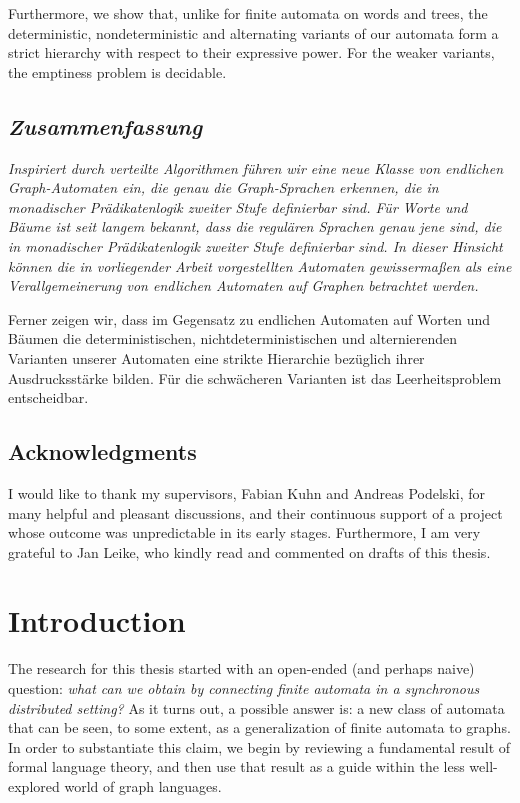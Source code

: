\documentclass[a4paper,11pt,twoside]{report} \pdfoutput=1
\begin{document}
Furthermore, we show that, unlike for finite automata on words and
trees, the deterministic, nondeterministic and alternating variants of
our automata form a strict hierarchy with respect to their expressive
power. For the weaker variants, the emptiness problem is decidable.

\vspace{.5cm}
\section*{\it{}\selectfont Zusammenfassung}
{\it
  Inspiriert durch verteilte Algorithmen führen wir eine neue Klasse
  von endlichen Graph-Automaten ein, die genau die Graph-Sprachen
  erkennen, die in mo\-na\-di\-scher Prädikatenlogik zweiter Stufe
  definierbar sind. Für Worte und Bäume ist seit langem bekannt, dass
  die regulären Sprachen genau jene sind, die in mo\-na\-di\-scher
  Prädikatenlogik zweiter Stufe definierbar sind. In dieser Hinsicht
  können die in vorliegender Arbeit vorgestellten Automaten gewissermaßen 
  als eine Verallgemeinerung von endlichen Automaten auf Graphen
  betrachtet werden.

  Ferner zeigen wir, dass im Gegensatz zu endlichen Automaten auf
  Worten und Bäumen die de\-ter\-mi\-nis\-tisch\-en,
  nichtdeterministischen und alternierenden Varianten unserer
  Automaten eine strikte Hierarchie bezüglich ihrer Ausdrucksstärke
  bilden. Für die schwächeren Varianten ist das Leerheitsproblem
  entscheidbar.  }

\clearpage
\thispagestyle{empty}
\section*{Acknowledgments}
I would like to thank my supervisors, Fabian Kuhn and Andreas
Podelski, for many helpful and pleasant discussions, and their
continuous support of a project whose outcome was unpredictable in its
early stages. Furthermore, I am very grateful to Jan Leike, who kindly
read and commented on drafts of this thesis.

\tableofcontents

\cleardoublepage
{}


\chapter{Introduction}
The research for this thesis started with an open-ended (and perhaps
naive) question: \emph{what can we obtain by connecting finite
  automata in a synchronous distributed setting?} As it turns out, a
possible answer is: a new class of automata that can be seen, to some
extent, as a generalization of finite automata to graphs. In order to
substantiate this claim, we begin by reviewing a fundamental result of
formal language theory, and then use that result as a guide within the
less well-explored world of graph languages.
\end{document}
